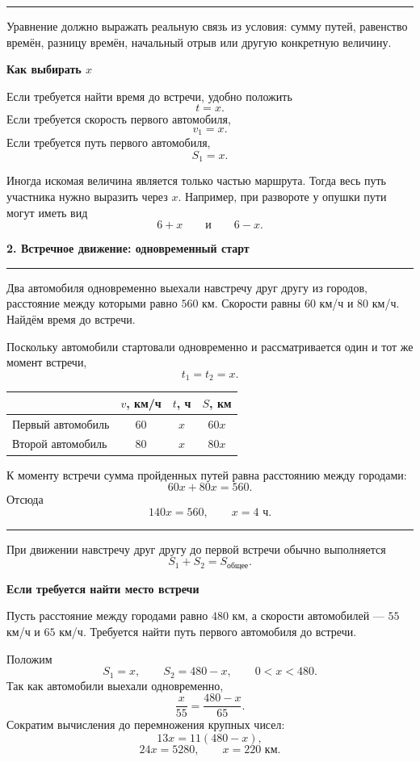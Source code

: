 \documentclass[a4paper,12pt]{article}
\newcommand{\sectiontitle}[1]{%
  \Needspace{6\baselineskip}%
  \vspace{0.25em}%
  {\Large\bfseries\color{darkaccent}#1}\par
  \vspace{0.25em}%
  \textcolor{rulegray}{\rule{\linewidth}{0.6pt}}%
  \vspace{0.35em}%
}
\newcommand{\subsectiontitle}[1]{%
  \Needspace{4\baselineskip}%
  \vspace{0.45em}%
  {\large\bfseries\color{darkaccent}#1}\par
  \vspace{0.15em}%
}
\newcommand{\important}[1]{%
  \par\vspace{0.2em}%
  \noindent
  \textcolor{accent}{\rule{2.4pt}{\baselineskip}}%
  \hspace{0.65em}%
  \begin{minipage}[t]{0.94\linewidth}
  #1
  \end{minipage}%
  \par\vspace{0.3em}%
}
\begin{document}
\important{
Уравнение должно выражать реальную связь из условия: сумму путей, равенство времён,
разницу времён, начальный отрыв или другую конкретную величину.
}

\subsectiontitle{Как выбирать \(x\)}

Если требуется найти время до встречи, удобно положить
\[
t=x.
\]
Если требуется скорость первого автомобиля,
\[
v_1=x.
\]
Если требуется путь первого автомобиля,
\[
S_1=x.
\]

Иногда искомая величина является только частью маршрута. Тогда весь путь участника
нужно выразить через \(x\). Например, при развороте у опушки пути могут иметь вид
\[
6+x
\qquad\text{и}\qquad
6-x.
\]

\sectiontitle{2. Встречное движение: одновременный старт}

Два автомобиля одновременно выехали навстречу друг другу из городов,
расстояние между которыми равно \(560\) км. Скорости равны \(60\) км/ч и \(80\) км/ч.
Найдём время до встречи.

Поскольку автомобили стартовали одновременно и рассматривается один и тот же момент встречи,
\[
t_1=t_2=x.
\]

\begin{center}
\renewcommand{\arraystretch}{1.35}
\begin{tabular}{@{}lccc@{}}
\toprule
 & \(v\), км/ч & \(t\), ч & \(S\), км\\
\midrule
Первый автомобиль & \(60\) & \(x\) & \(60x\)\\
Второй автомобиль & \(80\) & \(x\) & \(80x\)\\
\bottomrule
\end{tabular}
\end{center}

К моменту встречи сумма пройденных путей равна расстоянию между городами:
\[
60x+80x=560.
\]
Отсюда
\[
140x=560,
\qquad
\boxed{x=4\text{ ч}}.
\]

\important{
При движении навстречу друг другу до первой встречи обычно выполняется
\[
\boxed{S_1+S_2=S_{\text{общее}}}.
\]
}

\subsectiontitle{Если требуется найти место встречи}

Пусть расстояние между городами равно \(480\) км, а скорости автомобилей ---
\(55\) км/ч и \(65\) км/ч. Требуется найти путь первого автомобиля до встречи.

Положим
\[
S_1=x,
\qquad
S_2=480-x,
\qquad
0<x<480.
\]
Так как автомобили выехали одновременно,
\[
\frac{x}{55}=\frac{480-x}{65}.
\]
Сократим вычисления до перемножения крупных чисел:
\[
13x=11(480-x),
\]
\[
24x=5280,
\qquad
\boxed{x=220\text{ км}}.
\]
\end{document}
